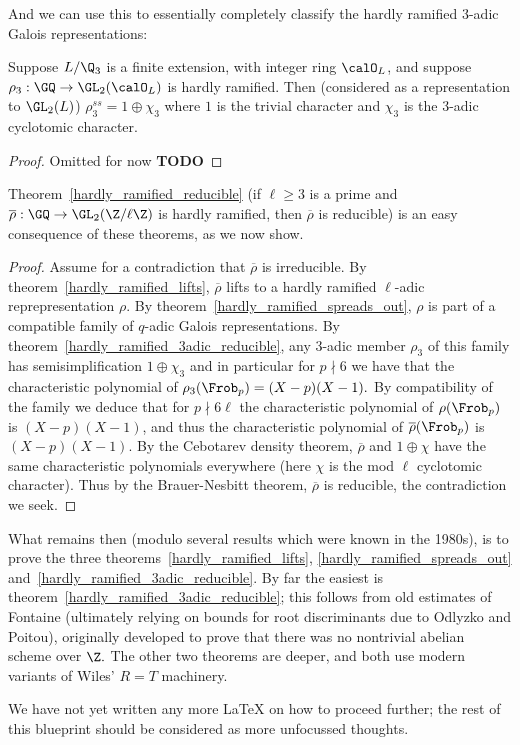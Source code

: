 And we can use this to essentially completely classify the hardly ramified 3-adic Galois
representations:


\begin{theorem}
  \label{hardly_ramified_3adic_reducible}
  \leanok
  Suppose $L/\Q_3$ is a finite extension, with integer ring $\calO_L$, and suppose
  $\rho_3:\GQ\to\GL_2(\calO_L)$ is hardly ramified. Then (considered as a representation
  to $\GL_2(L)$) $\rho_3^{ss}=1\oplus\chi_3$
  where $1$ is the trivial character and $\chi_3$ is the 3-adic cyclotomic character.
\end{theorem}
\begin{proof}
  Omitted for now {\bf TODO}
\end{proof}

Theorem~\ref{hardly_ramified_reducible} (if $\ell\geq 3$ is a prime and
$\overline{\rho}:\GQ\to\GL_2(\Z/\ell\Z)$ is hardly ramified,
then $\overline{\rho}$ is reducible) is an easy consequence of these theorems,
as we now show.

\begin{proof}
  Assume for a contradiction that $\overline{\rho}$ is irreducible. By theorem~\ref{hardly_ramified_lifts},
  $\overline{\rho}$ lifts to a hardly ramified $\ell$-adic reprepresentation $\rho$. By
  theorem~\ref{hardly_ramified_spreads_out}, $\rho$ is part of a compatible family of
  $q$-adic Galois representations. By theorem~\ref{hardly_ramified_3adic_reducible},
  any 3-adic member $\rho_3$ of this family has semisimplification $1\oplus\chi_3$ and in particular
  for $p\nmid 6$ we have that the characteristic polynomial of $\rho_3(\Frob_p)=(X-p)(X-1).$
  By compatibility of the family we deduce that for $p\nmid 6\ell$ the characteristic
  polynomial of $\rho(\Frob_p)$ is $(X-p)(X-1)$, and thus the characteristic polynomial
  of $\overline{\rho}(\Frob_p)$ is $(X-p)(X-1)$. By the Cebotarev density theorem,
  $\overline{\rho}$ and $1\oplus\chi$ have the same characteristic polynomials everywhere
  (here $\chi$ is the mod $\ell$ cyclotomic character). Thus by the Brauer-Nesbitt theorem,
  $\overline{\rho}$ is reducible, the contradiction we seek.
\end{proof}

What remains then (modulo several results which were known in the 1980s),
is to prove the three theorems~\ref{hardly_ramified_lifts},
\ref{hardly_ramified_spreads_out} and~\ref{hardly_ramified_3adic_reducible}.
By far the easiest is theorem~\ref{hardly_ramified_3adic_reducible}; this follows
from old estimates of Fontaine (ultimately relying on bounds for root discriminants due to
Odlyzko and Poitou), originally developed to prove that there was no
nontrivial abelian scheme over $\Z.$ The other two theorems are deeper, and both use
modern variants of Wiles' $R=T$ machinery.

We have not yet written any more LaTeX on how to proceed further; the rest of
this blueprint should be considered as more unfocussed thoughts.
